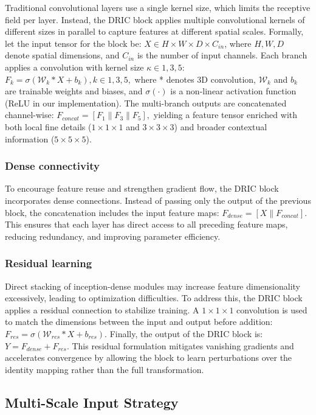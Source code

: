 \documentclass[a4paper,fleqn]{cas-dc}
\begin{document}
Traditional convolutional layers use a single kernel size, which limits the receptive field per layer. Instead, the DRIC block applies multiple convolutional kernels of different sizes in parallel to capture features at different spatial scales. Formally, let the input tensor for the block be: $X\in H \times W \times D \times C_{in}$, where $H, W, D$ denote spatial dimensions, and $C_{in}$ is the number of input channels. Each branch applies a convolution with kernel size $\kappa\in 1,3,5:$
$F_k = \sigma(\mathcal W_k * X + b_k ), k\in 1,3,5,$ where * denotes 3D convolution, $\mathcal W_k$ and $b_k$ are trainable weights and biases, and $\sigma(\cdot)$ is a non-linear activation function (ReLU in our implementation).
The multi-branch outputs are concatenated channel-wise: $F_{concat} =[F_1 \| F_3 \| F_5 ],$ yielding a feature tensor enriched with both local fine details ($1\times 1\times 1$ and $3\times 3\times 3$) and broader contextual information ($5\times 5\times 5$).

\subsubsection{Dense connectivity}

To encourage feature reuse and strengthen gradient flow, the DRIC block incorporates dense connections. Instead of passing only the output of the previous block, the concatenation includes the input feature maps: $F_{dense} =[X \| F_{concat}]$. This ensures that each layer has direct access to all preceding feature maps, reducing redundancy, and improving parameter efficiency.

\subsubsection{Residual learning}

Direct stacking of inception-dense modules may increase feature dimensionality excessively, leading to optimization difficulties. To address this, the DRIC block applies a residual connection to stabilize training. A $1\times 1\times 1$ convolution is used to match the dimensions between the input and output before addition: $F_{res} =\sigma (\mathcal W_{res} * X + b_{res})$. Finally, the output of the DRIC block is: $Y = F_{dense} +F_{res}$. This residual formulation mitigates vanishing gradients and accelerates convergence by allowing the block to learn perturbations over the identity mapping rather than the full transformation.

\subsection{Multi-Scale Input Strategy}
\end{document}
